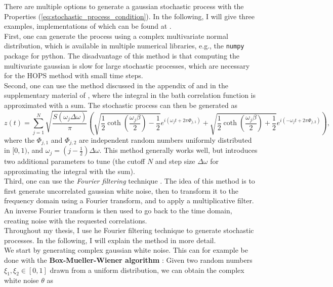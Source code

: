 There are multiple options to generate a gaussian stochastic process with the Properties (\ref{eq:stochastic_process_condition}).
In the following, I will give three examples, implementations of which can be found at \cite{Sappler:2023}. \\
First, one can generate the process using a complex multivariate normal distribution, which is available in multiple numerical libraries, e.g.,
the \verb|numpy| package for python. The disadvantage of this method is that computing the multivariate gaussian is slow for
large stochastic processes, which are necessary for the HOPS method with small time steps. \\
Second, one can use the method
discussed in the appendix of \cite{Song:2016} and in the supplementary material of \cite{Gao:2022}, where the integral in the
bath correlation function is approximated with a sum. The stochastic process can then be generated as
\begin{equation*}
    z(t) = \sum_{j=1}^{N} \sqrt{\frac{S(\omega_j\Delta \omega)}{\pi}} \left(
        \sqrt{\frac{1}{2}\coth\left(\frac{\omega_j\beta}{2}\right) - \frac{1}{2}} e^{i(\omega_j t + 2\pi\Phi_{j,1})}
        + \sqrt{\frac{1}{2}\coth\left(\frac{\omega_j\beta}{2}\right) + \frac{1}{2}} e^{i(-\omega_j t + 2\pi\Phi_{j,2})}
    \right),
\end{equation*} 
where the $\Phi_{j,1}$ and $\Phi_{j,2}$ are independent random numbers uniformly distributed in $[0, 1)$, and $\omega_j = \left(j - \frac{1}{2}\right)\Delta \omega$.
This method generally works well, but introduces two additional parameters to tune 
(the cutoff $N$ and step size $\Delta \omega$ for approximating the integral with the sum). \\
Third, one can use the \textit{Fourier filtering} technique \cite{Ojalvo:1994}. The idea of this method is to first generate uncorrelated gaussian
white noise, then to transform it to the frequency domain using a Fourier transform, and to apply a multiplicative filter. An inverse Fourier transform is
then used to go back to the time domain, creating noise with the requested correlations. \\
Throughout my thesis, I use he Fourier filtering technique to generate stochastic processes. In the following, I will explain
the method in more detail. \\
We start by generating complex gaussian white noise. This can for example be done with the \textbf{Box-Mueller-Wiener algorithm} \cite{Box:1958}:
Given two random numbers $\xi_1, \xi_2 \in[0, 1]$ drawn from a uniform distribution, we can obtain the complex white noise $\theta$ as

